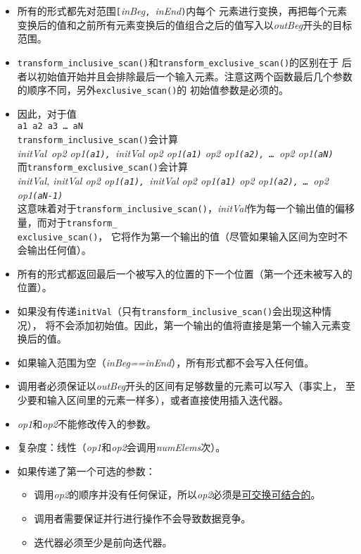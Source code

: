 \begin{itemize}
    \item 所有的形式都先对范围\texttt{[}\emph{inBeg}\texttt{, }\emph{inEnd}\texttt{)}内每个
    元素进行变换，再把每个元素变换后的值和之前所有元素变换后的值组合之后的值写入以\emph{outBeg}开头的目标范围。
    \item \texttt{transform\_inclusive\_scan()}和\texttt{transform\_exclusive\_scan()}的区别在于
    后者以初始值开始并且会排除最后一个输入元素。注意这两个函数最后几个参数的顺序不同，另外\texttt{exclusive\_scan()}的
    初始值参数是必须的。
    \item 因此，对于值\\
    \hspace*{2em}\texttt{a1 a2 a3 \ldots\ aN}\\
    \texttt{transform\_inclusive\_scan()}会计算\\
    \hspace*{2em}\emph{initVal\ op2  op1\texttt{(a1), }initVal op2 op1\texttt{(a1)} op2 op1\texttt{(a2), \ldots\ }op2 op1\texttt{(aN)}}\\
    而\texttt{transform\_exclusive\_scan()}会计算\\
    \hspace*{2em}\emph{initVal, initVal op2 op1\texttt{(a1), }initVal op2 op1\texttt{(a1)} op2 op1\texttt{(a2), \ldots\ }op2 op1\texttt{(aN-1)}}\\
    这意味着对于\texttt{transform\_inclusive\_scan()}，\emph{initVal}作为每一个输出值的偏移量，而对于\texttt{transform\_\\
    exclusive\_scan()}，
    它将作为第一个输出的值（尽管如果输入区间为空时不会输出任何值）。
    \item 所有的形式都返回最后一个被写入的位置的下一个位置（第一个还未被写入的位置）。
    \item 如果没有传递\texttt{initVal}（只有\texttt{transform\_inclusive\_scan()}会出现这种情况），
    将不会添加初始值。因此，第一个输出的值将直接是第一个输入元素变换后的值。
    \item 如果输入范围为空（\emph{inBeg==inEnd}），所有形式都不会写入任何值。
    \item 调用者必须保证以\emph{outBeg}开头的区间有足够数量的元素可以写入（事实上，
    至少要和输入区间里的元素一样多），或者直接使用插入迭代器。
    \item \emph{op1}和\emph{op2}不能修改传入的参数。
    \item 复杂度：线性（\emph{op1}和\emph{op2}会调用\emph{numElems}次）。
    \item 如果传递了第一个可选的参数：
    \begin{itemize}
        \item 调用\emph{op2}的顺序并没有任何保证，所以\emph{op2}必须是\hyperref[ch22.6.1.1]{可交换可结合的}。
        \item 调用者需要保证并行进行操作不会导致数据竞争。
        \item 迭代器必须至少是前向迭代器。
    \end{itemize}
\end{itemize}

